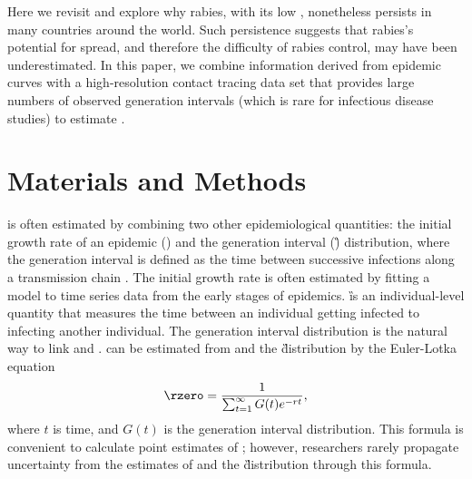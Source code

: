 Here we revisit and explore why rabies, with its low \rzero, nonetheless persists in many countries around the world. 
Such persistence suggests that rabies's potential for spread, and therefore the difficulty of rabies control, may have been underestimated. 
In this paper, we combine information derived from epidemic curves with a high-resolution contact tracing data set that provides large numbers of observed generation intervals (which is rare for infectious disease studies) to estimate \rzero.

\section*{Materials and Methods}

\rzero is often estimated by combining two other epidemiological quantities: the initial growth rate of an epidemic (\littler) and the generation interval (\G) distribution, where the generation interval is defined as the time between successive infections along a transmission chain \citep{park2018exploring}.
The initial growth rate \littler is often estimated by fitting a model to time series data from the early stages of epidemics.
\G is an individual-level quantity that measures the time between an individual getting infected to infecting another individual.
The generation interval distribution is the natural way to link \littler and \rzero \citep{wallinga2006generation, champredon2015intrinsic}.
\rzero can be estimated from \littler and the \G distribution
by the Euler-Lotka equation \citep{wallinga2006generation}
\begin{equation}
\rzero = \frac{1}{\sum_{t=1}^{\infty} G(t)e^{-rt}},
\label{eq:EL}
\end{equation}
where $t$ is time, and $G(t)$ is the generation interval distribution.
This formula is convenient to calculate point estimates of \rzero; however, researchers rarely propagate uncertainty from the estimates of \littler and the \G distribution through this formula.

